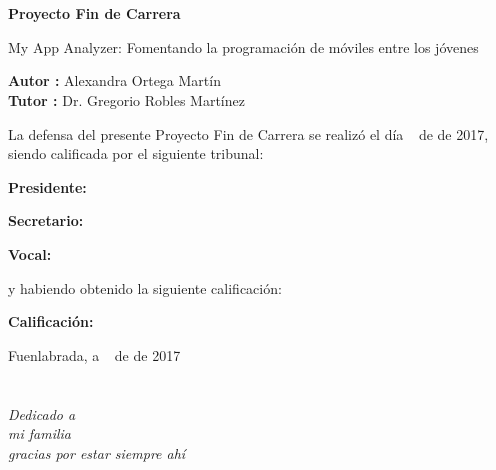\documentclass[a4paper, 12pt]{book}
\begin{document}
\clearpage
{}
\chapter*{}

\vspace{-4cm}
\begin{center}
\LARGE
\textbf{Proyecto Fin de Carrera}

\vspace{1cm}
\large
My App Analyzer: Fomentando la programación de móviles entre los jóvenes

\vspace{1cm}
\large
\textbf{Autor :} Alexandra Ortega Martín \\
\textbf{Tutor :} Dr. Gregorio Robles Martínez

\end{center}

\vspace{1cm}
La defensa del presente Proyecto Fin de Carrera se realizó el día \qquad$\;\,$ de \qquad\qquad\qquad\qquad \newline de 2017, siendo calificada por el siguiente tribunal:


\vspace{0.5cm}
\textbf{Presidente:}

\vspace{1.2cm}
\textbf{Secretario:}

\vspace{1.2cm}
\textbf{Vocal:}


\vspace{1.2cm}
y habiendo obtenido la siguiente calificación:

\vspace{1cm}
\textbf{Calificación:}


\vspace{1cm}
\begin{flushright}
Fuenlabrada, a \qquad$\;\,$ de \qquad\qquad\qquad\qquad de 2017
\end{flushright}


\chapter*{}
\begin{flushright}
\textit{Dedicado a \\
mi familia \\
gracias por estar siempre ahí}
\end{flushright}
\end{document}
